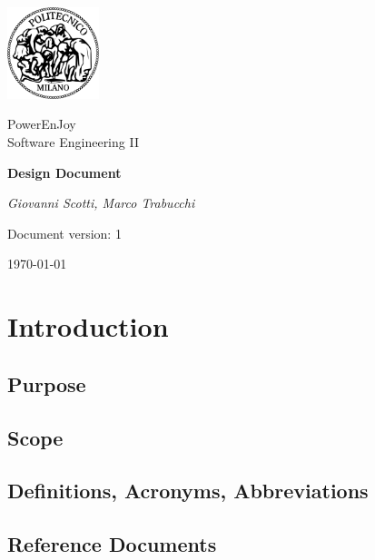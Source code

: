 \documentclass[a4paper,12pt]{report}
\begin{document}
\begin{titlepage}
\centering
\includegraphics[width=0.20\textwidth]{./pictures/logo_poli}\par
	\vspace{1.5cm}
	{\Large {PowerEnJoy \\ 
		Software Engineering II} \par}
	\vspace{1.5cm}
	{\LARGE \textbf{Design Document} \par}
	\vspace{1.5cm}
	{\Large\itshape Giovanni Scotti, Marco Trabucchi\par}
	\vspace{2cm}
	\vfill
	{\large Document version: 1\par}
	{\large \today \par}
\end{titlepage}

\tableofcontents

\chapter{Introduction}
\label{ch:Introduction}

\section{Purpose}


\section{Scope}


\section{Definitions, Acronyms, Abbreviations}


\section{Reference Documents}

\end{document}
